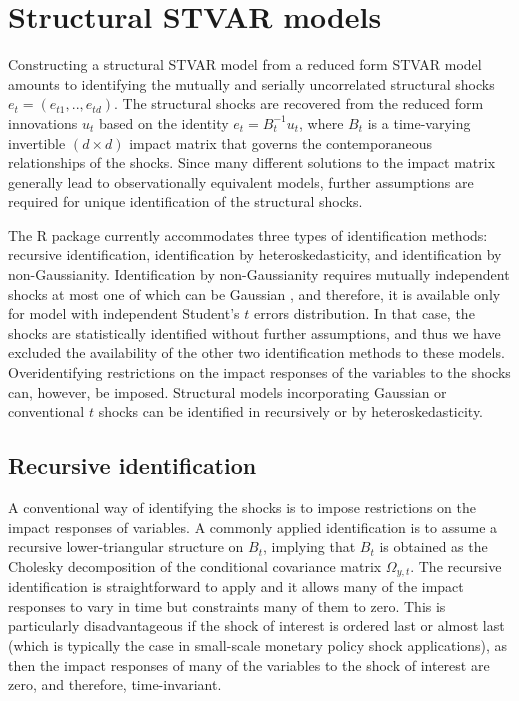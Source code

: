 \documentclass[nojss]{jss}
\begin{document}
\section{Structural STVAR models}\label{sec:struct_stvar}
Constructing a structural STVAR model from a reduced form STVAR model amounts to identifying the mutually and serially uncorrelated structural shocks $e_t=(e_{t1},..,e_{td})$. The structural shocks are recovered from the reduced form innovations $u_t$ based on the identity $e_t=B_t^{-1}u_t$, where $B_t$ is a time-varying invertible $(d\times d)$ impact matrix that governs the contemporaneous relationships of the shocks.  Since many different solutions to the impact matrix generally lead to observationally equivalent models, further assumptions are required for unique identification of the structural shocks.

The R package  currently accommodates three types of identification methods: recursive identification, identification by heteroskedasticity, and identification by non-Gaussianity. Identification by non-Gaussianity requires mutually independent shocks at most one of which can be Gaussian \citep{Virolainen2:2024}, and therefore, it is available only for model with independent Student's $t$ errors distribution. In that case, the shocks are statistically identified without further assumptions, and thus we have excluded the availability of the other two identification methods to these models. Overidentifying restrictions on the impact responses of the variables to the shocks can, however, be imposed. Structural models incorporating Gaussian or conventional $t$ shocks can be identified in  recursively or by heteroskedasticity.


\subsection{Recursive identification}

A conventional way of identifying the shocks is to impose restrictions on the impact responses of variables. A commonly applied identification is to assume a recursive lower-triangular structure on $B_t$, implying that $B_t$ is obtained as the Cholesky decomposition of the conditional covariance matrix $\Omega_{y,t}$. The recursive identification is straightforward to apply and it allows many of the impact responses to vary in time but constraints many of them to zero. This is particularly disadvantageous if the shock of interest is ordered last or almost last (which is typically the case in small-scale monetary policy shock applications), as then the impact responses of many of the variables to the shock of interest are zero, and therefore, time-invariant.
\end{document}
